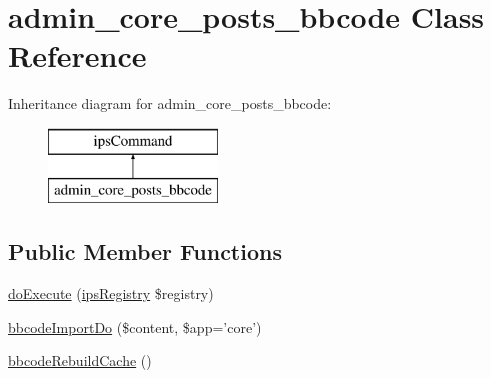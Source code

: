 \hypertarget{classadmin__core__posts__bbcode}{\section{admin\-\_\-core\-\_\-posts\-\_\-bbcode Class Reference}
\label{classadmin__core__posts__bbcode}
}
Inheritance diagram for admin\-\_\-core\-\_\-posts\-\_\-bbcode\-:\begin{figure}[H]
\begin{center}
\leavevmode
\includegraphics[height=2.000000cm]{classadmin__core__posts__bbcode}
\end{center}
\end{figure}
\subsection*{Public Member Functions}
\begin{DoxyCompactItemize}
\item 
\hyperlink{classadmin__core__posts__bbcode_afbc4e912a0604b94d47d66744c64d8ba}{do\-Execute} (\hyperlink{classips_registry}{ips\-Registry} \$registry)
\item 
\hyperlink{classadmin__core__posts__bbcode_a2338177ee186e3f34b2117186d540453}{bbcode\-Import\-Do} (\$content, \$app='core')
\item 
\hyperlink{classadmin__core__posts__bbcode_ade966678198212ed4163e34862440cc9}{bbcode\-Rebuild\-Cache} ()
\end{DoxyCompactItemize}
